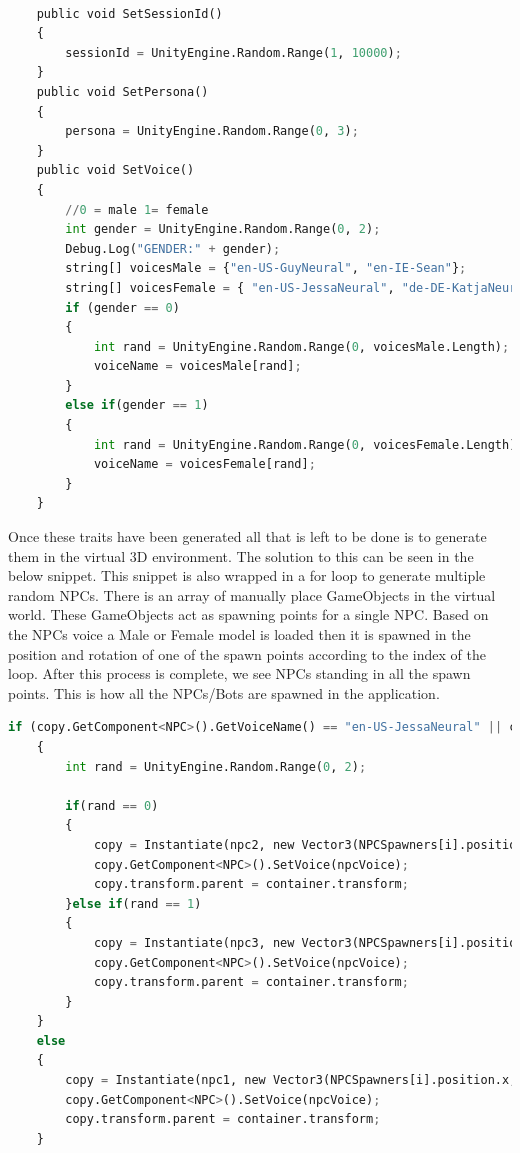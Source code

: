 \begin{lstlisting}[language=python]
    
    public void SetSessionId()
    {
        sessionId = UnityEngine.Random.Range(1, 10000);
    }
    public void SetPersona()
    {
        persona = UnityEngine.Random.Range(0, 3);
    }
    public void SetVoice()
    {
        //0 = male 1= female
        int gender = UnityEngine.Random.Range(0, 2);
        Debug.Log("GENDER:" + gender);
        string[] voicesMale = {"en-US-GuyNeural", "en-IE-Sean"};
        string[] voicesFemale = { "en-US-JessaNeural", "de-DE-KatjaNeural" };
        if (gender == 0)
        {
            int rand = UnityEngine.Random.Range(0, voicesMale.Length);
            voiceName = voicesMale[rand];
        }
        else if(gender == 1)
        {
            int rand = UnityEngine.Random.Range(0, voicesFemale.Length);
            voiceName = voicesFemale[rand];
        }
    }
\end{lstlisting}

Once these traits have been generated all that is left to be done is to generate them in the virtual 3D environment. The solution to this can be seen in the below snippet.
This snippet is also wrapped in a for loop to generate multiple random NPCs. There is an array of manually place GameObjects in the virtual world. These GameObjects act as spawning points for a single NPC. Based on the NPCs voice a Male or Female model is loaded then it is spawned in the position and rotation of one of the spawn points according to the index of the loop. After this process is complete, we see NPCs standing in all the spawn points. This is how all the NPCs/Bots are spawned in the application.\newline

\begin{lstlisting}[language=python]
    if (copy.GetComponent<NPC>().GetVoiceName() == "en-US-JessaNeural" || copy.GetComponent<NPC>().GetVoiceName() == "de-DE-KatjaNeural")
    {
        int rand = UnityEngine.Random.Range(0, 2);

        if(rand == 0)
        {
            copy = Instantiate(npc2, new Vector3(NPCSpawners[i].position.x, NPCSpawners[i].position.y, NPCSpawners[i].position.z), Quaternion.Euler(0, NPCSpawners[i].rotation.eulerAngles.y, 0));
            copy.GetComponent<NPC>().SetVoice(npcVoice);
            copy.transform.parent = container.transform;
        }else if(rand == 1)
        {
            copy = Instantiate(npc3, new Vector3(NPCSpawners[i].position.x, NPCSpawners[i].position.y, NPCSpawners[i].position.z), Quaternion.Euler(0, NPCSpawners[i].rotation.eulerAngles.y, 0));
            copy.GetComponent<NPC>().SetVoice(npcVoice);
            copy.transform.parent = container.transform;
        }
    }
    else
    {
        copy = Instantiate(npc1, new Vector3(NPCSpawners[i].position.x, NPCSpawners[i].position.y, NPCSpawners[i].position.z), Quaternion.Euler(0, NPCSpawners[i].rotation.eulerAngles.y, 0));
        copy.GetComponent<NPC>().SetVoice(npcVoice);
        copy.transform.parent = container.transform;
    }
\end{lstlisting}

